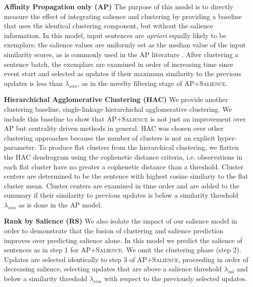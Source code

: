 \textbf{Affinity Propagation only (\textsc{AP}) } The purpose of this model 
is to 
directly measure the effect of integrating salience and clustering by 
providing a baseline that uses the identical clustering component, but without
the salience information. In this model, input sentences are \textit{apriori}
equally likely to be exemplars; the salience values are uniformly set as the 
median value of the  input similarity scores, as is commonly used in the 
\textsc{AP} 
literature \cite{frey2007clustering}. After clustering a sentence batch, the 
exemplars are examined in order of increasing time since event start and 
selected as updates if their maximum similarity to the previous updates is 
less than $\lambda_{sim}$, as in the novelty filtering stage of 
\textsc{AP+Salience}.


\textbf{Hierarchichal Agglomerative Clustering (HAC)} We provide another 
clustering baseline, single-linkage hierarchichal agglomerative clustering.
We include this baseline to show that \textsc{AP+Salience} is not just an 
improvement
over \textsc{AP} but centrality driven methods in general. \textsc{HAC} was 
chosen over other 
clustering approaches because the number of clusters is not an explicit 
hyper-parameter. To produce flat clusters from the hierarchical clustering, we
flatten the \textsc{HAC} dendrogram using the cophenetic distance criteria, 
i.e. 
observations in each flat cluster have no greater a cophenetic distance than a
threshold. Cluster centers are determined to be the sentence with highest 
cosine similariy to the flat cluster mean. Cluster centers are examined in 
time order and are added to the summary if their similarity to previous 
updates is below a similarity threshold $\lambda_{sim}$ as is done in the 
\textsc{AP} model.


\textbf{Rank by Salience (RS)} 
We also isolate the impact of our salience model in order to demonstrate 
that the fusion of clustering and salience prediction improves over
predicting salience alone. In this model we predict the salience of sentences 
as in step 1 for \textsc{AP+Salience}. We omit the clustering phase (step 2).
Updates are selected identically to step 3 of \textsc{AP+Salience}, 
proceeding in order
of decreasing salience, selecting updates that are above a salience 
threshold $\lambda_{sal}$ and below a similarity threshold $\lambda_{sim}$
with respect to the previously selected updates.
